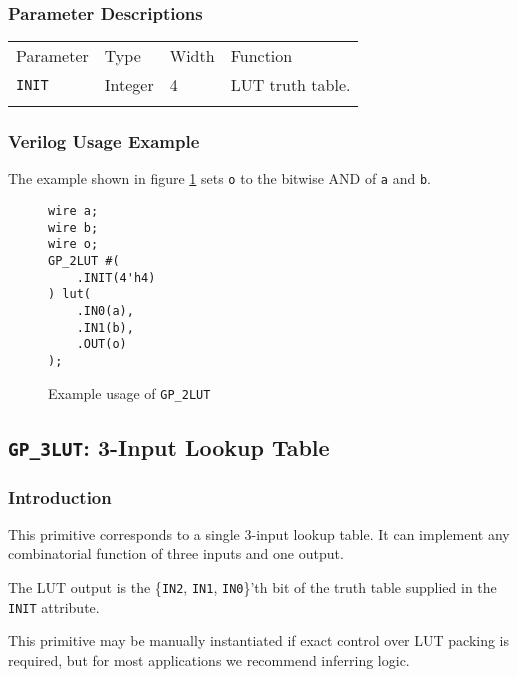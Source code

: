 \documentclass[11pt]{article}
\newcommand{\tokenstyle}[1]{\texttt{#1}}
\newcommand{\wirestyle}[1]{\texttt{#1}}
\newcommand{\whenstyle}[1]{{\fontseries{sb}\selectfont#1}}
\newcommand{\thinhline}{\Xhline{1\arrayrulewidth}}
\newcommand{\thickhline}{\Xhline{2.5\arrayrulewidth}}
\begin{document}
\subsubsection{Parameter Descriptions}

\begin{tabularx}{\textwidth}{lllX}
\thinhline
\whenstyle{Parameter} & \whenstyle{Type} & \whenstyle{Width} & \whenstyle{Function} \\
\thickhline
\tokenstyle{INIT} & Integer & 4 & LUT truth table. \\
\thinhline
\end{tabularx}

\subsubsection{Verilog Usage Example}

The example shown in figure \ref{gp-2LUT-example} sets \wirestyle{o} to the bitwise AND of \wirestyle{a} and \wirestyle{b}.

\begin{figure}[h]
\begin{lstlisting}
wire a;
wire b;
wire o;
GP_2LUT #(
	.INIT(4'h4)
) lut(
	.IN0(a),
	.IN1(b),
	.OUT(o)
);
\end{lstlisting}
\caption{Example usage of \tokenstyle{GP\_2LUT}}
\label{gp-2LUT-example}
\end{figure}


\pagebreak
\subsection{\tokenstyle{GP\_3LUT}: 3-Input Lookup Table}
\label{gp-3lut}

\subsubsection{Introduction}
This primitive corresponds to a single 3-input lookup table. It can implement any combinatorial function of three
inputs and one output.

The LUT output is the \{\tokenstyle{IN2}, \tokenstyle{IN1}, \tokenstyle{IN0}\}'th bit of the truth table supplied in the \tokenstyle{INIT} attribute.

This primitive may be manually instantiated if exact control over LUT packing is required, but for most applications we
recommend inferring logic.
\end{document}
